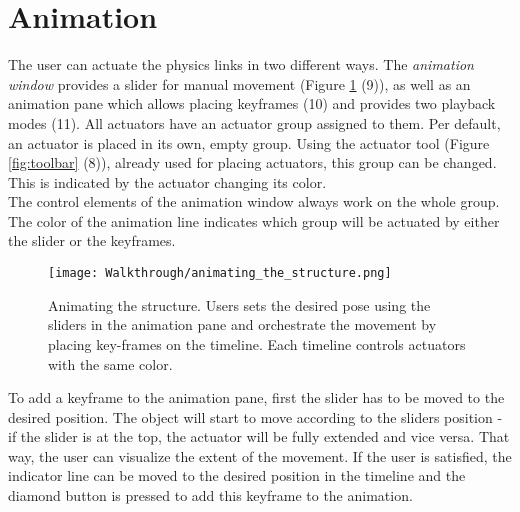 \section{Animation}\label{sec:animation}
The user can actuate the physics links in two different ways. The \textit{animation window} provides a slider for manual movement (Figure \ref{fig:animation} (9)), as well as an animation pane which allows placing keyframes (10) and provides two playback modes (11). All actuators have an actuator group assigned to them. Per default, an actuator is placed in its own, empty group. Using the actuator tool (Figure \ref{fig:toolbar} (8)), already used for placing actuators, this group can be changed. This is indicated by the actuator changing its color.\\
The control elements of the animation window always work on the whole group. The color of the animation line indicates which group will be actuated by either the slider or the keyframes.
\begin{figure}[ht!]
    \texttt{[image: Walkthrough/animating\_the\_structure.png]}
    \centering
    \caption{Animating the structure. Users sets the desired pose using the sliders in the animation pane and orchestrate the movement by placing key-frames on the timeline. Each timeline controls actuators with the same color.}
    \label{fig:animation}
\end{figure}
To add a key\-frame to the animation pane, first the slider has to be moved to the desired position. The object will start to move according to the sliders position - if the slider is at the top, the actuator will be fully extended and vice versa. That way, the user can visualize the extent of the movement. If the user is satisfied, the indicator line can be moved to the desired position in the timeline and the diamond button is pressed to add this keyframe to the animation.

